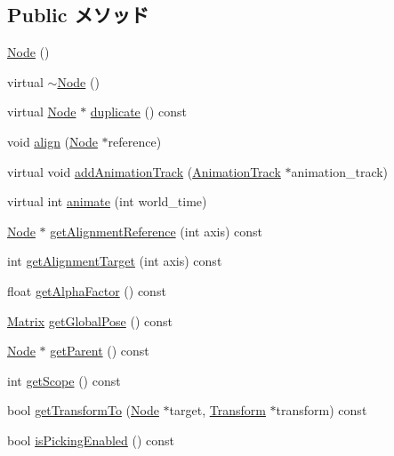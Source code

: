 \subsection*{Public メソッド}
\begin{CompactItemize}
\item 
\hyperlink{classm3g_1_1Node_0d313fac56abd7ebe58a17f1530b879e}{Node} ()
\item 
virtual \hyperlink{classm3g_1_1Node_6fa6bf60f34f1e3efb0e59333428c9c8}{$\sim$Node} ()
\item 
virtual \hyperlink{classm3g_1_1Node}{Node} $\ast$ \hyperlink{classm3g_1_1Node_0b9f7531a4b56d34f47aeb1fff0d37e0}{duplicate} () const 
\item 
void \hyperlink{classm3g_1_1Node_3db1b4be060fe3d4f3dbf9720ef85234}{align} (\hyperlink{classm3g_1_1Node}{Node} $\ast$reference)
\item 
virtual void \hyperlink{classm3g_1_1Node_415c0b110f95410ded9b85e5d99a496b}{addAnimationTrack} (\hyperlink{classm3g_1_1AnimationTrack}{AnimationTrack} $\ast$animation\_\-track)
\item 
virtual int \hyperlink{classm3g_1_1Node_8aad1ceab4c2a03609c8a42324ce484d}{animate} (int world\_\-time)
\item 
\hyperlink{classm3g_1_1Node}{Node} $\ast$ \hyperlink{classm3g_1_1Node_ca338390bd2dee287fe6f5cbc4e094e1}{getAlignmentReference} (int axis) const 
\item 
int \hyperlink{classm3g_1_1Node_e5bbf42b3d88193fda0b476e1b1da009}{getAlignmentTarget} (int axis) const 
\item 
float \hyperlink{classm3g_1_1Node_bf7e8f9d9f530274aaf27e69910f8689}{getAlphaFactor} () const 
\item 
\hyperlink{classm3g_1_1Matrix}{Matrix} \hyperlink{classm3g_1_1Node_b50dd3f0331a71cf820bbd1edc894ef0}{getGlobalPose} () const 
\item 
\hyperlink{classm3g_1_1Node}{Node} $\ast$ \hyperlink{classm3g_1_1Node_ce26c2757f265bc6038e6818d2eb6ad9}{getParent} () const 
\item 
int \hyperlink{classm3g_1_1Node_a3c291c19cf805338fa4ad3c3deb663a}{getScope} () const 
\item 
bool \hyperlink{classm3g_1_1Node_206a2e95eb7db42e6880414f77858113}{getTransformTo} (\hyperlink{classm3g_1_1Node}{Node} $\ast$target, \hyperlink{classm3g_1_1Transform}{Transform} $\ast$transform) const 
\item 
bool \hyperlink{classm3g_1_1Node_b3187e5056afa4a94af03e34125c86b1}{isPickingEnabled} () const 
\item 

\end{CompactItemize}
